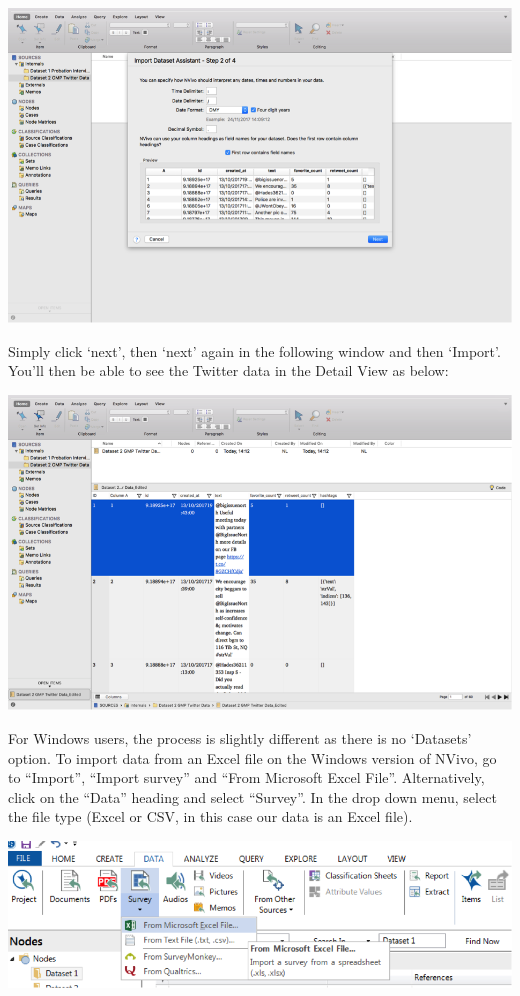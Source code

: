\documentclass[]{book}
\theoremstyle{definition}
\theoremstyle{definition}
\theoremstyle{definition}
\theoremstyle{remark}
\begin{document}
\includegraphics{imgs/qual_33.png}

Simply click `next', then `next' again in the following window and then
`Import'. You'll then be able to see the Twitter data in the Detail View
as below:

\includegraphics{imgs/qual_34.png}

For Windows users, the process is slightly different as there is no
`Datasets' option. To import data from an Excel file on the Windows
version of NVivo, go to ``Import'', ``Import survey'' and ``From
Microsoft Excel File''. Alternatively, click on the ``Data'' heading and
select ``Survey''. In the drop down menu, select the file type (Excel or
CSV, in this case our data is an Excel file).

\includegraphics{imgs/qual_35.png}
\end{document}
